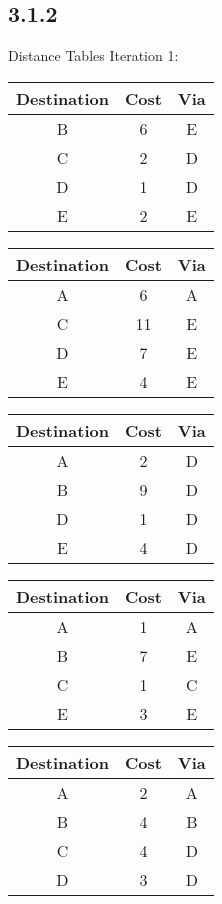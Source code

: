 \documentclass[a4paper,
			llpt,
			solution,
			accentcolor=tud2d,
			colorbacktitle
			]
			{tudexercise}
\newcommand{\8}{$\infty$}
\begin{document}
\clearpage
\subsection{3.1.2}
Distance Tables Iteration 1:\\
\begin{tabular}{c|c|c}
Destination & Cost & Via \\ \hline
B           & 6    & E   \\
C           & 2    & D   \\
D           & 1    & D   \\
E           & 2    & E   \\
\end{tabular}
\begin{tabular}{c|c|c}
Destination & Cost & Via \\ \hline
A           & 6    & A   \\
C           & 11   & E   \\
D           & 7    & E   \\
E           & 4    & E   \\
\end{tabular}
\begin{tabular}{c|c|c}
Destination & Cost & Via \\ \hline
A           & 2    & D   \\
B           & 9    & D   \\
D           & 1    & D   \\
E           & 4    & D   \\
\end{tabular}
\begin{tabular}{c|c|c}
Destination & Cost & Via \\ \hline
A           & 1    & A   \\
B           & 7    & E   \\
C           & 1    & C   \\
E           & 3    & E   \\
\end{tabular}
\begin{tabular}{c|c|c}
Destination & Cost & Via \\ \hline
A           & 2    & A   \\
B           & 4    & B   \\
C           & 4    & D   \\
D           & 3    & D   \\
\end{tabular}
\\
\end{document}

